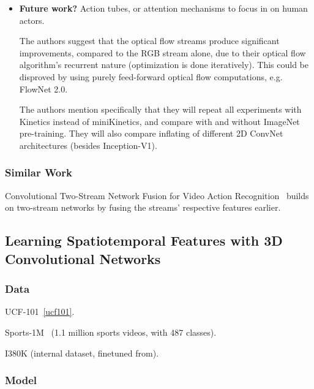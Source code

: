 \documentclass[a4paper, 12pt]{article}
\begin{document}
\begin{itemize}
        \item \textbf{Future work?} Action tubes, or attention mechanisms to
                focus in on human actors.

                The authors suggest that the optical flow streams produce
                significant improvements, compared to the RGB stream alone, due
                to their optical flow algorithm's recurrent nature
                (optimization is done iteratively).  This could be disproved by
                using purely feed-forward optical flow computations, e.g.
                FlowNet 2.0.

                The authors mention specifically that they will repeat all
                experiments with Kinetics instead of miniKinetics, and compare
                with and without ImageNet pre-training. They will also compare
                inflating of different 2D ConvNet architectures (besides
                Inception-V1).
\end{itemize}

\subsubsection{Similar Work}

Convolutional Two-Stream Network Fusion for Video Action
Recognition~\citet{DBLP:journals/corr/FeichtenhoferPZ16} builds on two-stream
networks by fusing the streams' respective features earlier.


\subsection{Learning Spatiotemporal Features with 3D Convolutional
            Networks\citet{DBLP:journals/corr/TranBFTP14}}

\subsubsection{Data}

UCF-101~\ref{ucf101}.

Sports-1M~\citet{KarpathyCVPR14} (1.1 million sports videos, with 487 classes).

I380K (internal dataset, finetuned from).

\subsubsection{Model}
\end{document}
